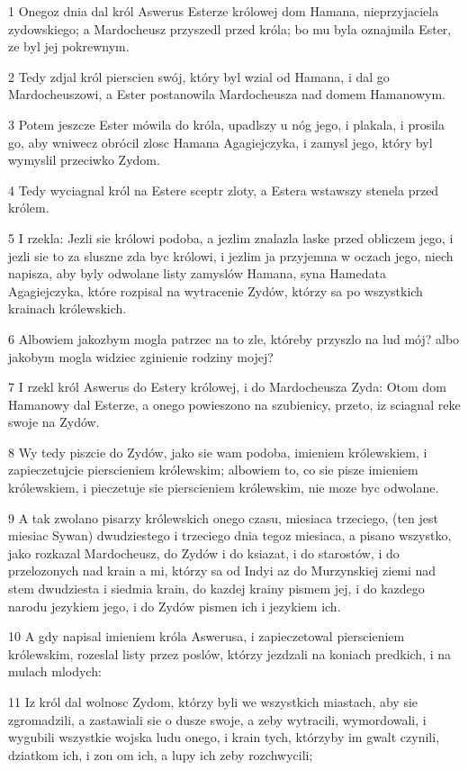 \par 1 Onegoz dnia dal król Aswerus Esterze królowej dom Hamana, nieprzyjaciela zydowskiego; a Mardocheusz przyszedl przed króla; bo mu byla oznajmila Ester, ze byl jej pokrewnym.
\par 2 Tedy zdjal król pierscien swój, który byl wzial od Hamana, i dal go Mardocheuszowi, a Ester postanowila Mardocheusza nad domem Hamanowym.
\par 3 Potem jeszcze Ester mówila do króla, upadlszy u nóg jego, i plakala, i prosila go, aby wniwecz obrócil zlosc Hamana Agagiejczyka, i zamysl jego, który byl wymyslil przeciwko Zydom.
\par 4 Tedy wyciagnal król na Estere sceptr zloty, a Estera wstawszy stenela przed królem.
\par 5 I rzekla: Jezli sie królowi podoba, a jezlim znalazla laske przed obliczem jego, i jezli sie to za sluszne zda byc królowi, i jezlim ja przyjemna w oczach jego, niech napisza, aby byly odwolane listy zamyslów Hamana, syna Hamedata Agagiejczyka, które rozpisal na wytracenie Zydów, którzy sa po wszystkich krainach królewskich.
\par 6 Albowiem jakozbym mogla patrzec na to zle, któreby przyszlo na lud mój? albo jakobym mogla widziec zginienie rodziny mojej?
\par 7 I rzekl król Aswerus do Estery królowej, i do Mardocheusza Zyda: Otom dom Hamanowy dal Esterze, a onego powieszono na szubienicy, przeto, iz sciagnal reke swoje na Zydów.
\par 8 Wy tedy piszcie do Zydów, jako sie wam podoba, imieniem królewskiem, i zapieczetujcie pierscieniem królewskim; albowiem to, co sie pisze imieniem królewskiem, i pieczetuje sie pierscieniem królewskim, nie moze byc odwolane.
\par 9 A tak zwolano pisarzy królewskich onego czasu, miesiaca trzeciego, (ten jest miesiac Sywan) dwudziestego i trzeciego dnia tegoz miesiaca, a pisano wszystko, jako rozkazal Mardocheusz, do Zydów i do ksiazat, i do starostów, i do przelozonych nad krain a mi, którzy sa od Indyi az do Murzynskiej ziemi nad stem dwudziesta i siedmia krain, do kazdej krainy pismem jej, i do kazdego narodu jezykiem jego, i do Zydów pismen ich i jezykiem ich.
\par 10 A gdy napisal imieniem króla Aswerusa, i zapieczetowal pierscieniem królewskim, rozeslal listy przez poslów, którzy jezdzali na koniach predkich, i na mulach mlodych:
\par 11 Iz król dal wolnosc Zydom, którzy byli we wszystkich miastach, aby sie zgromadzili, a zastawiali sie o dusze swoje, a zeby wytracili, wymordowali, i wygubili wszystkie wojska ludu onego, i krain tych, którzyby im gwalt czynili, dziatkom ich, i zon om ich, a lupy ich zeby rozchwycili;

